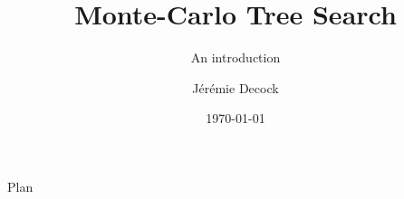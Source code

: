 \documentclass{beamer}
\title{Monte-Carlo Tree Search}
\subtitle{An introduction}
\author[Decock]{Jérémie Decock}
\date{\today}
\begin{document}
\begin{frame}
    \titlepage
\end{frame}


\begin{frame}{Plan}
    \tableofcontents
\end{frame}


\end{document}
